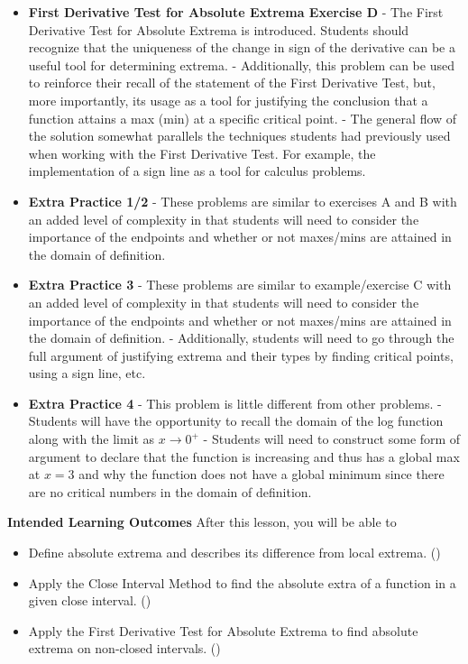 \documentclass[10pt]{article}
\begin{document}
{\begin{itemize}
    \item {\bf First Derivative Test for Absolute Extrema Exercise D}  
    - The  First Derivative Test for Absolute Extrema is introduced. Students should recognize that the uniqueness of the change in sign of the derivative can be a useful tool for determining extrema. 
    - Additionally, this problem can be used to reinforce their recall of the statement of the First Derivative Test, but, more importantly, its usage as a tool for justifying the conclusion that a function attains a max (min) at a specific critical point.
    - The general flow of the solution somewhat parallels the techniques students had previously used when working with the First Derivative Test. For example, the implementation of a sign line as a tool for calculus problems.
    
    \item {\bf Extra Practice 1/2}  
    - These problems are similar to exercises A and B with an added level of complexity in that students will need to consider the importance of the endpoints and whether or not maxes/mins are attained in the domain of definition. 
   \item {\bf Extra Practice 3}  
    - These problems are similar to example/exercise C with an added level of complexity in that students will need to consider the importance of the endpoints and whether or not maxes/mins are attained in the domain of definition. 
    - Additionally, students will need to go through the full argument of justifying extrema and their types by finding critical points, using a sign line, etc. 
    \item {\bf Extra Practice 4}  
    - This problem is little different from other problems. 
    - Students will have the opportunity to recall the domain of the log function along with the limit as $x \to 0^{+}$
    - Students will need to construct some form of argument to declare that the function is increasing and thus has a global max at $x = 3$ and why the function does not have a global minimum since there are no critical numbers in the domain of definition.
\end{itemize}
}

\newpage
{}

\textbf{Intended Learning Outcomes}
After this lesson, you will be able to 

\begin{itemize}
    \item Define absolute extrema and describes its difference from local extrema. ()
    \item Apply the Close Interval Method to find the absolute extra of a function in a given close interval. ()
    \item Apply the First Derivative Test for Absolute Extrema to find absolute extrema on non-closed intervals. ()
\end{itemize}
\end{document}
